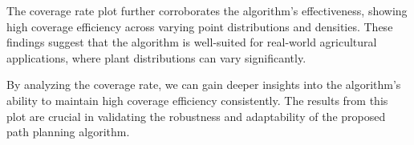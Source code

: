 \vspace*{6mm}

The coverage rate plot further corroborates the algorithm's effectiveness, showing high coverage efficiency across varying point distributions and densities. These findings suggest that the algorithm is well-suited for real-world agricultural applications, where plant distributions can vary significantly.

\vspace*{6mm}  


By analyzing the coverage rate, we can gain deeper insights into the algorithm's ability to maintain high coverage efficiency consistently. The results from this plot are crucial in validating the robustness and adaptability of the proposed path planning algorithm. 